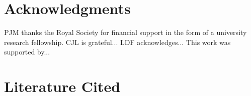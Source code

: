 \documentclass{ar2e}
\begin{document}
\section*{Acknowledgments}


PJM thanks the Royal Society for financial support in the form of a university
research fellowship. 
%
CJL is grateful...
%
LDF acknowledges...
% 
This work was supported by...


\section{Literature Cited}





\end{document}
